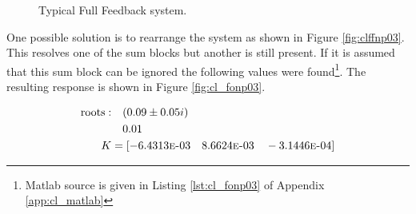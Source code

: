 \documentclass{article}
\begin{document}
\begin{figure}[hpb!]
\begin{center}


\end{center}

\caption{Typical Full Feedback system.}
\label{fig:clffnp02}
\end{figure}

One possible solution is to rearrange the system as shown
in Figure \ref{fig:clffnp03}.
This resolves one of the sum blocks but another is still present.
If it is assumed that this sum block can be ignored the following
values were found\footnote{Matlab source is given in
Listing \ref{lst:cl_fonp03} of Appendix \ref{app:cl_matlab}}.
The resulting response is shown in Figure \ref{fig:cl_fonp03}.

\begin{align*}
	\text{roots} :& \quad (0.09 \pm 0.05i) \\
				& \quad 0.01 \\
	K &= [ -6.4313\mbox{\sc{e}-}03 \quad 8.6624\mbox{\sc{e}-}03
			\quad -3.1446\mbox{\sc{e}-}04 ]
\end{align*}
\end{document}
